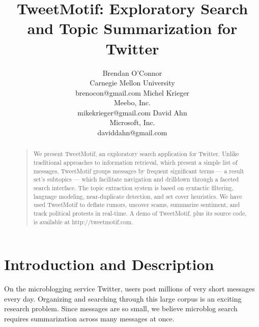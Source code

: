 \documentclass[letterpaper]{article}
\newcommand{\bto}[1]{\textcolor{blue}{\textbf{[#1 --BTO]}}}
\begin{document}
%
\title{TweetMotif: Exploratory Search and Topic Summarization for Twitter}
\author{Brendan O'Connor \\ 
Carnegie Mellon University \\ brenocon@gmail.com
\And
Michel Krieger \\ Meebo, Inc. \\ mikekrieger@gmail.com
\And
David Ahn \\ Microsoft, Inc. \\ daviddahn@gmail.com
}
\maketitle
\begin{abstract}
\begin{quote}
We present TweetMotif, an exploratory search application for Twitter.  Unlike traditional approaches to information retrieval, which present a simple list of messages, TweetMotif groups messages by frequent significant terms --- a result set's subtopics --- which facilitate navigation and drilldown through a faceted search interface.  The topic extraction system is based on syntactic filtering, language modeling, near-duplicate detection, and set cover heuristics.  We have used TweetMotif to deflate rumors, uncover scams, summarize sentiment, and track political protests in real-time.   A demo of TweetMotif, plus its source code, is available at http://tweetmotif.com.
\end{quote}
\end{abstract}

\section{Introduction and Description}


On the microblogging service Twitter, users post millions of very short messages every day.  Organizing and searching through this large corpus is an exciting research problem.  Since messages are so small, we believe microblog search requires summarization across many messages at once.
\end{document}
